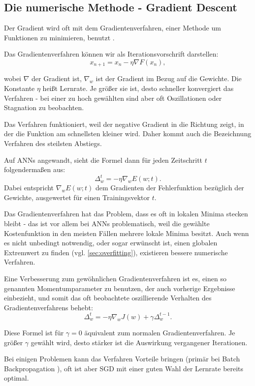 \subsection{Die numerische Methode - Gradient Descent}

Der Gradient wird oft mit dem Gradientenverfahren, einer Methode um Funktionen zu minimieren, benutzt \cite{bishop1995neural,bengio2012practical}.

Das Gradientenverfahren können wir als Iterationsvorschrift darstellen:
\begin{equation}
x_{n+1}=x_n- \eta  \nabla F(x_n), 
\end{equation}

wobei $\nabla$ der Gradient ist, $\nabla_w$ ist der Gradient im Bezug auf die Gewichte. 
Die Konstante $\eta$ heißt Lernrate. Je größer sie ist, desto schneller konvergiert das Verfahren - bei einer zu hoch gewählten sind aber oft Oszillationen oder Stagnation zu beobachten. 

Das Verfahren funktioniert, weil der negative Gradient in die Richtung zeigt, in der die Funktion am schnellsten kleiner wird. Daher kommt auch die Bezeichnung Verfahren des steilsten Abstiegs.

Auf ANNs angewandt, sieht die Formel dann für jeden Zeitschritt $t$ folgendermaßen aus:
\begin{equation}
  \Delta_w^t = - \eta  \nabla_w E(w;t).
\end{equation}
Dabei entspricht $\nabla_w E(w;t)$ dem Gradienten der Fehlerfunktion bezüglich der Gewichte, ausgewertet für einen Trainingsvektor $t$.

Das Gradientenverfahren hat das Problem, dass es oft in lokalen Minima stecken bleibt - das ist vor allem bei ANNs problematisch, weil die gewählte Kostenfunktion in den meisten Fällen mehrere lokale Minima besitzt. Auch wenn es nicht unbedingt notwendig, oder sogar erwünscht ist, einen globalen Extremwert zu finden (vgl. \ref{sec:overfitting}), existieren bessere numerische Verfahren. 

Eine Verbesserung zum gewöhnlichen Gradientenverfahren ist es, einen so genannten Momentumparameter zu benutzen, der auch vorherige Ergebnisse einbezieht, und somit das oft beobachtete oszillierende Verhalten des Gradientenverfahrens behebt:
\begin{equation}
 \Delta_w^t = - \eta  \nabla_w J(w) + \gamma \Delta_w^{t-1}.
\end{equation}

Diese Formel ist für $\gamma = 0$ äquivalent zum normalen Gradientenverfahren. Je größer $\gamma$ gewählt wird, desto stärker ist die Auswirkung vergangener Iterationen. 

Bei einigen Problemen kann das Verfahren Vorteile bringen (primär bei Batch Backpropagation \cite{lecunefficient}), oft ist aber SGD mit einer guten Wahl der Lernrate bereits optimal\cite{bengio2012practical}.
